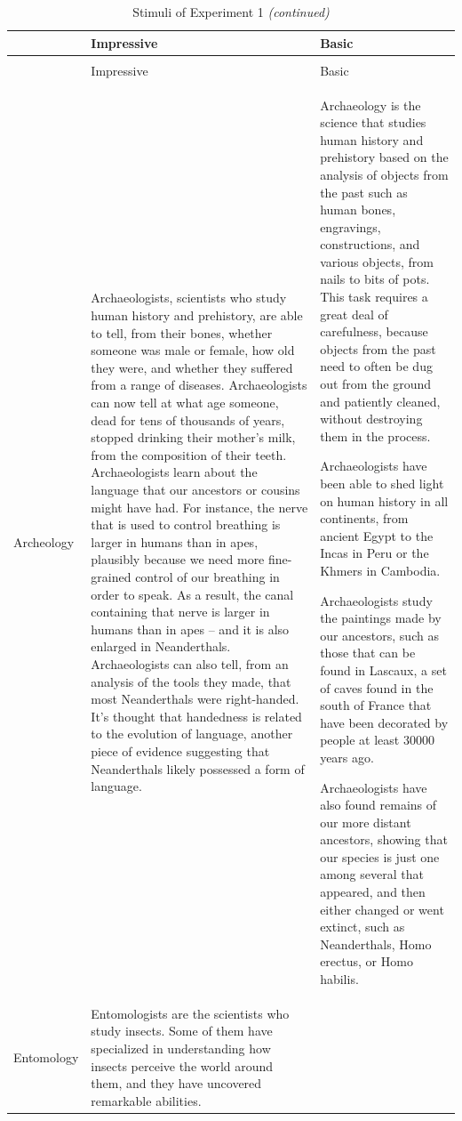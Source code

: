 \documentclass[
  doc,floatsintext]{apa6}
\begin{document}
\begin{longtable}[t]{>{\raggedright\arraybackslash}p{5em}>{\raggedright\arraybackslash}p{25em}>{\raggedright\arraybackslash}p{25em}}
\caption{\label{tab:exp1-stimuli}Stimuli of Experiment 1}\\
\toprule
 & Impressive & Basic\\
\midrule
\endfirsthead
\caption[]{\label{tab:exp1-stimuli}Stimuli of Experiment 1 \textit{(continued)}}\\
\toprule
 & Impressive & Basic\\
\midrule
\endhead

\endfoot
\bottomrule
\endlastfoot
Archeology & Archaeologists, scientists who study human history and prehistory, are able to tell, from their bones, whether someone was male or female, how old they were, and whether they suffered from a range of diseases. Archaeologists can now tell at what age someone, dead for tens of thousands of years, stopped drinking their mother’s milk, from the composition of their teeth.
Archaeologists learn about the language that our ancestors or cousins might have had. For instance, the nerve that is used to control breathing is larger in humans than in apes, plausibly because we need more fine-grained control of our breathing in order to speak. As a result, the canal containing that nerve is larger in humans than in apes – and it is also enlarged in Neanderthals.
Archaeologists can also tell, from an analysis of the tools they made, that most Neanderthals were right-handed. It’s thought that handedness is related to the evolution of language, another piece of evidence suggesting that Neanderthals likely possessed a form of language. & Archaeology is the science that studies human history and prehistory based on the analysis of objects from the past such as human bones, engravings, constructions, and various objects, from nails to bits of pots. This task requires a great deal of carefulness, because objects from the past need to often be dug out from the ground and patiently cleaned, without destroying them in the process.

Archaeologists have been able to shed light on human history in all continents, from ancient Egypt to the Incas in Peru or the Khmers in Cambodia.

Archaeologists study the paintings made by our ancestors, such as those that can be found in Lascaux, a set of caves found in the south of France that have been decorated by people at least 30000 years ago.

Archaeologists have also found remains of our more distant ancestors, showing that our species is just one among several that appeared, and then either changed or went extinct, such as Neanderthals, Homo erectus, or Homo habilis.\\
Entomology & Entomologists are the scientists who study insects. Some of them have specialized in understanding how insects perceive the world around them, and they have uncovered remarkable abilities. 


\end{longtable}
\end{document}
